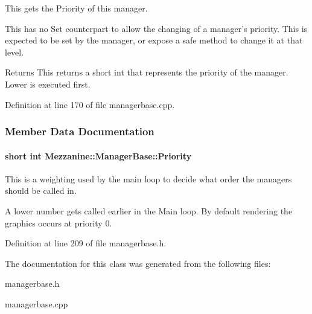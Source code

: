 This gets the Priority of this manager. 

This has no Set counterpart to allow the changing of a manager's priority. This is expected to be set by the manager, or expose a safe method to change it at that level. \begin{DoxyReturn}{Returns}
This returns a short int that represents the priority of the manager. Lower is executed first. 
\end{DoxyReturn}


Definition at line 170 of file managerbase.cpp.



\subsubsection{Member Data Documentation}
\hypertarget{classMezzanine_1_1ManagerBase_a96fb02bf2f4e8b4afe70dedd0d8c6ac9}{
\paragraph[{Priority}]{\setlength{\rightskip}{0pt plus 5cm}short int {\bf Mezzanine::ManagerBase::Priority}}\hfill}
\label{classMezzanine_1_1ManagerBase_a96fb02bf2f4e8b4afe70dedd0d8c6ac9}


This is a weighting used by the main loop to decide what order the managers should be called in. 

A lower number gets called earlier in the Main loop. By default rendering the graphics occurs at priority 0. 

Definition at line 209 of file managerbase.h.



The documentation for this class was generated from the following files:\begin{DoxyCompactItemize}
\item 
managerbase.h\item 
managerbase.cpp\end{DoxyCompactItemize}
